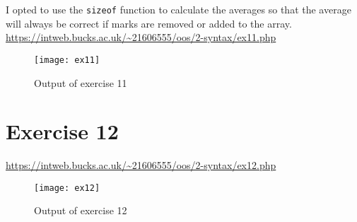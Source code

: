 I opted to use the \texttt{sizeof} function to calculate the averages so that the average will always be correct if marks are removed or added to the array.\\

\url{https://intweb.bucks.ac.uk/~21606555/oos/2-syntax/ex11.php}
\captionsetup{type=figure}


\begin{figure}[H]
  \caption{Output of exercise 11}
  \centering
  \texttt{[image: ex11]}
\end{figure}

\section{Exercise 12}

\url{https://intweb.bucks.ac.uk/~21606555/oos/2-syntax/ex12.php}
\captionsetup{type=figure}


\begin{figure}[H]
  \caption{Output of exercise 12}
  \centering
  \texttt{[image: ex12]}
\end{figure}
